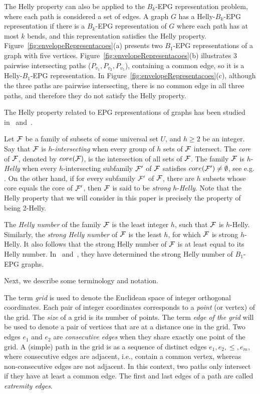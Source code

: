 The Helly property can also be applied to the $B_k$-EPG representation problem, where each path is considered a set of edges. A graph $G$ has a  Helly-$B_k$-EPG representation if there is a $B_k$-EPG representation of $G$ where each path has at most $k$ bends, and this representation satisfies the Helly property. Figure~\ref{fig:envelopeRepresentacoes}(a) presents two $B_1$-EPG representations of a graph with five vertices.  Figure~\ref{fig:envelopeRepresentacoes}(b)   illustrates 3 pairwise intersecting paths ($P_{v_1}, P_{v_2}, P_{v_5}$), containing a common edge, so it is a Helly-$B_1$-EPG representation. In Figure~\ref{fig:envelopeRepresentacoes}(c), although the three paths are pairwise intersecting, there is no common edge in all three paths, and therefore they do not satisfy the Helly property.

The Helly property related to EPG representations of graphs has been studied in~\cite{golumbic2009} and~\cite{golumbic2013}. 

Let $\cal {F}$ be a family of subsets of some universal set $U$, and $h\geq 2$ be an integer.  Say that $\cal{F}$ is $h$-{\it intersecting} when every group of $h$ sets of $\cal {F}$ intersect. The {\it core} of $\cal {F}$, denoted by $core(\cal F)$, is the intersection of all sets of $\cal {F}$. The family $\cal{F}$ is $h$-{\it Helly} when every $h$-intersecting subfamily $\cal{F'}$ of $\cal{F}$ satisfies $core(\cal{F'}) \neq \emptyset$, see e.g. \cite{D76}. On the other hand, if for every subfamily $\cal{F'}$ of $\cal{F}$, there are $h$ subsets whose core equals the core of  $\cal {F'}$, then $\cal {F}$ is said to be {\it strong} $h$-{\it Helly}.
Note that the Helly property that we will consider in this paper is precisely the property of being 2-Helly. 

The  {\it Helly number} of the family $\cal{F}$ is the least integer $h$, such that $\cal{F}$ is $h$-Helly. Similarly, the {\it strong Helly number} of $\cal{F}$ is the least $h$, for which  $\cal{F}$ is strong $h$-Helly. It also follows that the strong Helly number of $\cal{F}$ is at least equal to its Helly number. In~\cite{golumbic2009} and~\cite{golumbic2013}, they have determined the strong Helly number of $B_1$-EPG graphs. 




Next, we describe some terminology and notation.

The term \emph{grid} is used to denote the Euclidean space of integer orthogonal coordinates. Each pair of integer coordinates corresponds to a \emph{point} (or vertex) of the grid. The \emph{size} of a grid is its number of points. The term \emph{edge of the grid} will be used to denote a pair of vertices that are at a distance one in the grid. Two edges $e_1$ and $e_2$ are \emph{consecutive edges} when they share exactly one point of the grid.
 A (simple) path in the grid is as a sequence of distinct edges $e_1, e_2, \leq, e_m$,  where consecutive edges are adjacent, i.e., contain a common vertex, whereas non-consecutive edges are not adjacent.  In this context, two paths only intersect if they have at least a common edge. The first and last edges of a path are called \emph{extremity edges}.
  
